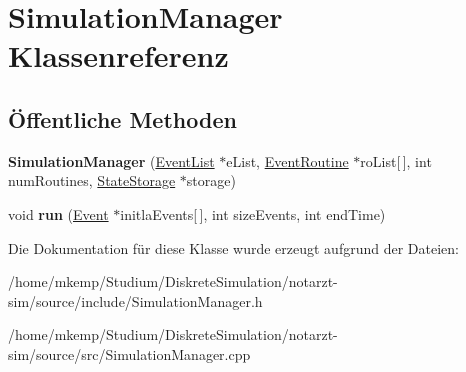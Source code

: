 \hypertarget{classSimulationManager}{}\section{Simulation\+Manager Klassenreferenz}
\label{classSimulationManager}
\subsection*{Öffentliche Methoden}
\begin{DoxyCompactItemize}
\item 
{\bfseries Simulation\+Manager} (\hyperlink{classEventList}{Event\+List} $\ast$e\+List, \hyperlink{classEventRoutine}{Event\+Routine} $\ast$ro\+List\mbox{[}$\,$\mbox{]}, int num\+Routines, \hyperlink{classStateStorage}{State\+Storage} $\ast$storage)\hypertarget{classSimulationManager_a18663d0d7986354524b23a03a3ab85df}{}\label{classSimulationManager_a18663d0d7986354524b23a03a3ab85df}

\item 
void {\bfseries run} (\hyperlink{classEvent}{Event} $\ast$initla\+Events\mbox{[}$\,$\mbox{]}, int size\+Events, int end\+Time)\hypertarget{classSimulationManager_a01eb4300acb43110ca98ea8020d15cb9}{}\label{classSimulationManager_a01eb4300acb43110ca98ea8020d15cb9}

\end{DoxyCompactItemize}


Die Dokumentation für diese Klasse wurde erzeugt aufgrund der Dateien\+:\begin{DoxyCompactItemize}
\item 
/home/mkemp/\+Studium/\+Diskrete\+Simulation/notarzt-\/sim/source/include/Simulation\+Manager.\+h\item 
/home/mkemp/\+Studium/\+Diskrete\+Simulation/notarzt-\/sim/source/src/Simulation\+Manager.\+cpp\end{DoxyCompactItemize}
